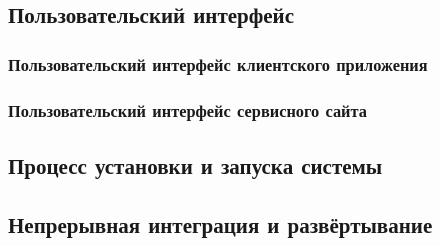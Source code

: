 \subsection{Пользовательский интерфейс}

\subsubsection{Пользовательский интерфейс клиентского приложения}

\subsubsection{Пользовательский интерфейс сервисного сайта}

\subsection{Процесс установки и запуска системы}

\subsection{Непрерывная интеграция и развёртывание}

